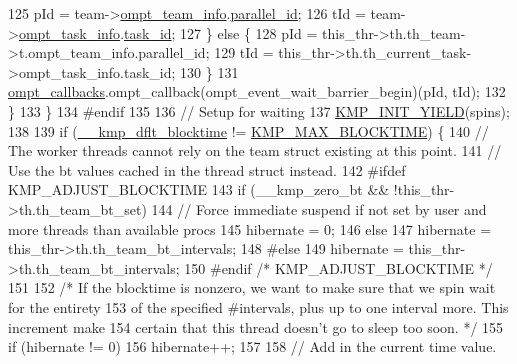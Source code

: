\begin{DoxyCode}
{125                 pId = team->\hyperlink{structompt__lw__taskteam__s_a548ab004e1bed7cea20532f1e168ce3d}{ompt\_team\_info}.\hyperlink{structompt__team__info__t_aea8969d8ca37577c35b466c675a7a241}{parallel\_id};
126                 tId = team->\hyperlink{structompt__lw__taskteam__s_aef7e0a0307d5b34644ddaa0cc7e9ba46}{ompt\_task\_info}.\hyperlink{structompt__task__info__t_a9b45ec47bd1086973892108a3a71e6fe}{task\_id};
127             \} \textcolor{keywordflow}{else} \{
128                 pId = this\_thr->th.th\_team->t.ompt\_team\_info.parallel\_id;
129                 tId = this\_thr->th.th\_current\_task->ompt\_task\_info.task\_id;
130             \}
131             \hyperlink{ompt-general_8c_a84a29d89cef82c7c38e1ee1f70ec994f}{ompt\_callbacks}.ompt\_callback(ompt\_event\_wait\_barrier\_begin)(pId, tId);
132         \}
133     \}
134 \textcolor{preprocessor}{#endif}
135 \textcolor{preprocessor}{}
136     \textcolor{comment}{// Setup for waiting}
137     \hyperlink{kmp_8h_a98cb21bfd34ebd451007a151f135b31c}{KMP\_INIT\_YIELD}(spins);
138 
139     \textcolor{keywordflow}{if} (\hyperlink{kmp_8h_a3b56e2e90e1539c0b794e4137724bc1c}{\_\_kmp\_dflt\_blocktime} != \hyperlink{kmp_8h_a1ca6c6ce04115f143dc5df627de57958}{KMP\_MAX\_BLOCKTIME}) \{
140         \textcolor{comment}{// The worker threads cannot rely on the team struct existing at this point.}
141         \textcolor{comment}{// Use the bt values cached in the thread struct instead.}
142 \textcolor{preprocessor}{#ifdef KMP\_ADJUST\_BLOCKTIME}
143 \textcolor{preprocessor}{}        \textcolor{keywordflow}{if} (\_\_kmp\_zero\_bt && !this\_thr->th.th\_team\_bt\_set)
144             \textcolor{comment}{// Force immediate suspend if not set by user and more threads than available procs}
145             hibernate = 0;
146         \textcolor{keywordflow}{else}
147             hibernate = this\_thr->th.th\_team\_bt\_intervals;
148 \textcolor{preprocessor}{#else}
149 \textcolor{preprocessor}{}        hibernate = this\_thr->th.th\_team\_bt\_intervals;
150 \textcolor{preprocessor}{#endif }\textcolor{comment}{/* KMP\_ADJUST\_BLOCKTIME */}\textcolor{preprocessor}{}
151 \textcolor{preprocessor}{}
152         \textcolor{comment}{/* If the blocktime is nonzero, we want to make sure that we spin wait for the entirety}
153 \textcolor{comment}{           of the specified #intervals, plus up to one interval more.  This increment make}
154 \textcolor{comment}{           certain that this thread doesn't go to sleep too soon.  */}
155         \textcolor{keywordflow}{if} (hibernate != 0)
156             hibernate++;
157 
158         \textcolor{comment}{// Add in the current time value.}
}
\end{DoxyCode}
